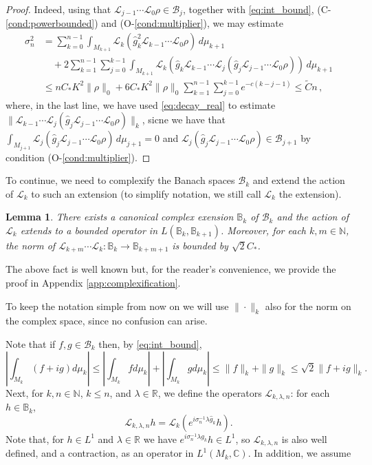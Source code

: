 \documentclass{amsart}
\numberwithin{equation}{section}
\newtheorem{lem}[thm]{Lemma}
\newcommand\cB{{\mathcal B}}
\newcommand\cL{{\mathcal L}}
\newcommand\bB{{\mathbb B}}
\newcommand\bC{{\mathbb C}}
\newcommand\bN{{\mathbb N}}
\newcommand\bR{{\mathbb R}}
\begin{document}
\begin{proof}
Indeed, using that $\cL_{j-1} \cdots \cL_0 \rho \in \cB_j$, together with \eqref{eq:int_bound},
(C-\ref{cond:powerbounded})
and (O-\ref{cond:multiplier}), we may estimate
\begin{equation}
\label{eq:var_upper}
\begin{split}
\sigma_n^2 & = \sum_{k=0}^{n-1} \int_{M_{k+1}} \cL_k( {\hat g}^2_k \cL_{k-1} \cdots \cL_0 \rho) \, d\mu_{k+1} \\
& \quad +  2 \sum_{k=1}^{n-1} \sum_{j=0}^{k-1} \int_{M_{k+1}} \cL_{k}(\hat g_{k}\cL_{k-1}\cdots \cL_{j}(\hat g_j\cL_{j-1}\cdots \cL_{0}\rho)) \, d\mu_{k+1} \\
& \le n C_* K^2 \| \rho \|_0 + 6 C_* K^2 \| \rho \|_0 \sum_{k=1}^{n-1} \sum_{j=0}^{k-1} e^{-c(k-j-1)} 
\le \tilde{C} n \, ,
\end{split} 
\end{equation} 
where, in the last line, we have used \eqref{eq:decay_real} to estimate
$\| \cL_{k-1}\cdots \cL_{j}(\hat g_j\cL_{j-1}\cdots \cL_{0}\rho) \|_k$, sicne we have that $\int_{M_{j+1}} \cL_{j}(\hat g_j\cL_{j-1}\cdots \cL_{0}\rho) \, d\mu_{j+1} =0$ and $\cL_{j}(\hat g_j\cL_{j-1}\cdots \cL_{0}\rho) \in \cB_{j+1}$ by condition (O-\ref{cond:multiplier}).
\end{proof}
To continue, we need to complexify the Banach spaces $\cB_k$ and extend the action of $\cL_k$ to such an extension (to simplify notation, we still call $\cL_k$ the extension).
\begin{lem}\label{lem:complexification} There exists a canonical complex exension $\bB_k$ of $\cB_k$ and the action of $\cL_k$ extends to a bounded operator in $L(\bB_k,\bB_{k+1})$.
Moreover, for  each $k,m\in\bN$, the norm of $\cL_{k+m}\cdots\cL_k:\bB_k\to\bB_{k+m+1}$ is bounded by $\sqrt 2 C_*$.
\end{lem}
The above fact is well known but, for the reader's convenience, we provide the proof in Appendix \ref{app:complexification}.

To keep the notation simple from now on we will use $\|\cdot\|_k$ also for the norm on the complex space, since no confusion can arise.

Note that if $f,g\in \cB_k$ then, by \eqref{eq:int_bound},
\begin{equation}\label{eq:int_bound2}
\left|\int_{M_k} (f+ig)d\mu_k\right|\leq \left|\int_{M_k} f d\mu_k\right|+\left|\int_{M_k} g d\mu_k\right|\leq \|f\|_k+\|g\|_k\leq \sqrt 2\|f+ig\|_k.
\end{equation}
Next, for $k,n \in \bN$, $k \le n$,  and $\lambda \in \mathbb{R}$, we define the operators $\cL_{k,\lambda, n}$: for each $h\in \bB_k$,
\begin{equation}\label{eq:twisted}
\cL_{k,\lambda, n} h=\cL_k (e^{i\sigma_n^{-1}\lambda \hat g_k}h ).
\end{equation}
Note that, for $h\in L^1$ and $\lambda\in\bR$ we have $e^{i\sigma_n^{-1}\lambda g_k}h\in L^1$, so $\cL_{k,\lambda,n}$ is also well defined, and a contraction, as an operator in $L^1(M_k,\bC)$.
In addition, we assume
\end{document}
